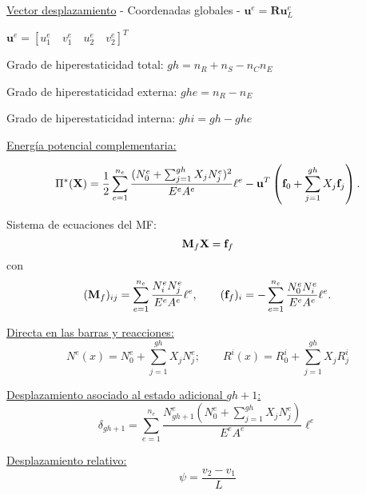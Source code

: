 \vspace{0.3cm}
\underline{Vector desplazamiento} - Coordenadas globales - $\textbf{u}^e=\textbf{R} \textbf{u}_ L^e$

\vspace{0.3cm}
$\textbf{u}^e=[u_1^e \quad v_1^e  \quad u_2^e \quad v_2^e]^T$ \centering


\begin{center}
\end{center}


Grado de hiperestaticidad total: $gh=n_R + n_S - n_C n_E$\raggedright

Grado de hiperestaticidad externa: $ghe=n_R - n_E$

Grado de hiperestaticidad interna: $ghi=gh - ghe$

\vspace{0.3cm}
\underline{Energía potencial complementaria:}\raggedright

$$
\Pi^* ({\bf X}) = \frac{1}{2}  \sum_{e=1}^{n_e} \frac{(N_0^e + \sum_{j=1}^{gh} X_j N_j^e)^2}{E^e A^e} \ell^e - {\bf u}^T \left( {\bf f}_0 +  \sum_{j=1}^{gh} X_j {\bf f}_j \right).
$$


Sistema de ecuaciones del MF:
$$
{\bf M}_f {\bf X} = {\bf f}_f
$$
%
con
$$
({\bf M}_f)_{ij} =  \sum_{e=1}^{n_e} \frac{N_i^e N_j^e }{E^e A^e} \ell^e,
\qquad
({\bf f}_f)_{i} =  - \sum_{e=1}^{n_e} \frac{N_0^e N_i^e }{E^e A^e} \ell^e.
$$

\underline{Directa en las barras y reacciones:}
$$
N^e (x)=N_0^e +  \sum_{j=1}^{gh} X_j N_j^e ;
\qquad
R^i(x)=R_0^i +  \sum_{j=1}^{gh} X_j R_j^i
$$

\underline{Desplazamiento asociado al estado adicional $gh+1$:}
$$
\delta_{gh+1}= \sum_{e=1}^{n_e} \frac{N_{gh+1}^e (N_0^e + \sum_{j=1}^{gh} X_j N_j^e)}{E^e A^e} \ell^e 
$$

\begin{center}
\end{center}

\begin{center}
	\def\svgwidth{0.85\textwidth}
	
\end{center}

\underline{Desplazamiento relativo:}
$$\psi=\frac{v_2 - v_1}{L}$$

